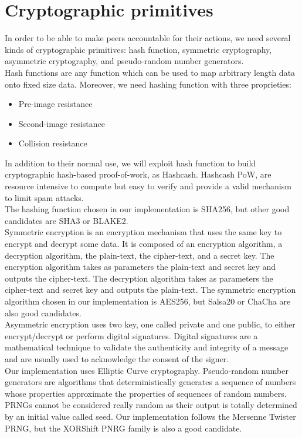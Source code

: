 \documentclass[mscthesis]{usiinfthesis}
\begin{document}
\section{Cryptographic primitives}
In order to be able to make peers accountable for their actions, we need several kinds of cryptographic primitives: hash function, symmetric cryptography, asymmetric cryptography, and pseudo-random number generators. \\
Hash functions are any function which can be used to map arbitrary length data onto fixed size data. Moreover, we need hashing function with three proprieties:
\begin{itemize}
	\item Pre-image resistance
	\item Second-image resistance
	\item Collision resistance
\end{itemize}
In addition to their normal use, we will exploit hash function to build cryptographic hash-based proof-of-work, as Hashcash\citep{back2002hashcash}. Hashcash PoW, are resource intensive to compute but easy to verify and provide a valid mechanism to limit spam attacks. \\
The hashing function chosen in our implementation is SHA256, but other good candidates are SHA3 or BLAKE2. \\
Symmetric encryption is an encryption mechanism that uses the same key to encrypt and decrypt some data. It is composed of an encryption algorithm, a decryption algorithm, the plain-text, the cipher-text, and a secret key. The encryption algorithm takes as parameters the plain-text and secret key and outputs the cipher-text. The decryption algorithm takes as parameters the cipher-text and secret key and outputs the plain-text. The symmetric encryption algorithm chosen in our implementation is AES256, but Salsa20 or ChaCha are also good candidates. \\
Asymmetric encryption uses two key, one called private and one public, to either encrypt/decrypt or perform digital signatures. Digital signatures are a mathematical technique to validate the authenticity and integrity of a message and are usually used to acknowledge the consent of the signer.  \\
Our implementation uses Elliptic Curve cryptography.
Pseudo-random number generators are algorithms that deterministically generates a sequence of numbers whose properties approximate the properties of sequences of random numbers. PRNGs cannot be considered really random as their output is totally determined by an initial value called seed. Our implementation follows the Mersenne Twister PRNG, but the XORShift PNRG family is also a good candidate.
\end{document}
